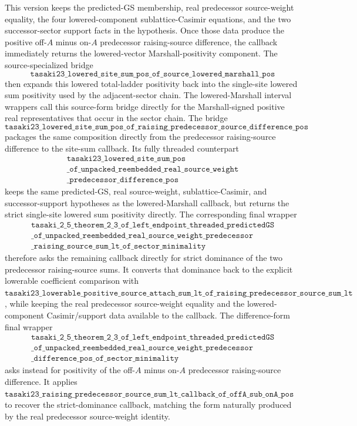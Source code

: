 \documentclass[a4paper,11pt]{article}
\begin{document}
This version keeps the predicted-GS membership, real predecessor
source-weight equality, the four lowered-component sublattice-Casimir
equations, and the two successor-sector support facts in the hypothesis.
Once those data produce the positive off-\(A\) minus on-\(A\)
predecessor raising-source difference, the callback immediately returns
the lowered-vector Marshall-positivity component.
The source-specialized bridge
\[
\texttt{tasaki23\_lowered\_site\_sum\_pos\_of\_source\_lowered\_marshall\_pos}
\]
then expands this lowered total-ladder positivity back into the
single-site lowered sum positivity used by the adjacent-sector chain.
The lowered-Marshall interval wrappers call this source-form bridge
directly for the Marshall-signed positive real representatives that occur
in the sector chain.
The bridge
\[
\texttt{tasaki23\_lowered\_site\_sum\_pos\_of\_raising\_predecessor\_source\_difference\_pos}
\]
packages the same composition directly from the predecessor
raising-source difference to the site-sum callback.
Its fully threaded counterpart
\[
\begin{gathered}
\texttt{tasaki23\_lowered\_site\_sum\_pos}\\
\texttt{\_of\_unpacked\_reembedded\_real\_source\_weight}\\
\texttt{\_predecessor\_difference\_pos}
\end{gathered}
\]
keeps the same predicted-GS, real source-weight, sublattice-Casimir, and
successor-support hypotheses as the lowered-Marshall callback, but
returns the strict single-site lowered sum positivity directly.
The corresponding final wrapper
\[
\begin{gathered}
\texttt{tasaki\_2\_5\_theorem\_2\_3\_of\_left\_endpoint\_threaded\_predictedGS}\\
\texttt{\_of\_unpacked\_reembedded\_real\_source\_weight\_predecessor}\\
\texttt{\_raising\_source\_sum\_lt\_of\_sector\_minimality}
\end{gathered}
\]
therefore asks the remaining callback directly for strict dominance of
the two predecessor raising-source sums.  It converts that dominance
back to the explicit lowerable coefficient comparison with
\(\texttt{tasaki23\_lowerable\_positive\_source\_attach\_sum\_lt\_of\_raising\_predecessor\_source\_sum\_lt}\),
while keeping the real predecessor source-weight equality and the
lowered-component Casimir/support data available to the callback.
The difference-form final wrapper
\[
\begin{gathered}
\texttt{tasaki\_2\_5\_theorem\_2\_3\_of\_left\_endpoint\_threaded\_predictedGS}\\
\texttt{\_of\_unpacked\_reembedded\_real\_source\_weight\_predecessor}\\
\texttt{\_difference\_pos\_of\_sector\_minimality}
\end{gathered}
\]
asks instead for positivity of the off-\(A\) minus on-\(A\) predecessor
raising-source difference.  It applies
\(\texttt{tasaki23\_raising\_predecessor\_source\_sum\_lt\_callback\_of\_offA\_sub\_onA\_pos}\)
to recover the strict-dominance callback, matching the form naturally
produced by the real predecessor source-weight identity.
\end{document}

